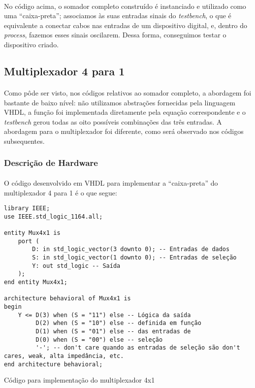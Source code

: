 \documentclass[a4paper,12pt]{article}
\newenvironment{code}{\captionsetup{type=listing}}{}
\begin{document}
\paragraph{}
No código acima, o somador completo construído é instanciado e utilizado como uma ``caixa-preta''; associamos às suas entradas sinais do \textit{testbench}, o que é equivalente a conectar cabos nas entradas de um dispositivo digital, e, dentro do \textit{process}, fazemos esses sinais oscilarem. Dessa forma, conseguimos testar o dispositivo criado.

\subsection{Multiplexador 4 para 1}
\paragraph{}
Como pôde ser visto, nos códigos relativos ao somador completo, a abordagem foi bastante de baixo nível: não utilizamos abstrações fornecidas pela linguagem VHDL, a função foi implementada diretamente pela equação correspondente e o \textit{testbench} gerou todas as oito possíveis combinações das três entradas. A abordagem para o multiplexador foi diferente, como será observado nos códigos subsequentes.

\subsubsection{Descrição de Hardware}
\paragraph{}
O código desenvolvido em VHDL para implementar a ``caixa-preta'' do multiplexador 4 para 1 é o que segue:

\begin{code}
\begin{verbatim}
library IEEE;
use IEEE.std_logic_1164.all;

entity Mux4x1 is
    port (
        D: in std_logic_vector(3 downto 0); -- Entradas de dados
        S: in std_logic_vector(1 downto 0); -- Entradas de seleção
        Y: out std_logic -- Saída
    );
end entity Mux4x1;

architecture behavioral of Mux4x1 is
begin
    Y <= D(3) when (S = "11") else -- Lógica da saída
         D(2) when (S = "10") else -- definida em função
         D(1) when (S = "01") else -- das entradas de
         D(0) when (S = "00") else -- seleção
         '-'; -- don't care quando as entradas de seleção são don't cares, weak, alta impedância, etc.
end architecture behavioral;
\end{verbatim}
\caption{Código para implementação do multiplexador 4x1}
\end{code}
\end{document}
